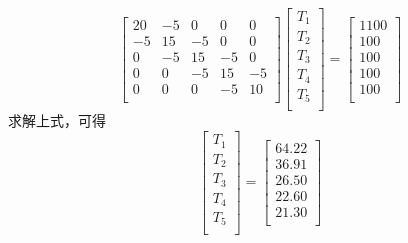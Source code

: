 \begin{equation}
  \begin{bmatrix}
    20 & -5 & 0 & 0 & 0 \\
    -5 & 15 & -5 & 0 & 0 \\
    0 & -5 & 15 & -5 & 0  \\
    0 & 0 & -5 & 15 & -5   \\
    0 & 0 & 0 & -5 & 10 \\
  \end{bmatrix}
  \begin{bmatrix}
    T_{1} \\
    T_{2} \\
    T_{3} \\
    T_{4} \\
    T_{5} \\
  \end{bmatrix}
  =
  \begin{bmatrix}
    1100 \\
    100 \\ 
    100 \\ 
    100 \\ 
    100 \\ 
  \end{bmatrix}
\end{equation}
求解上式，可得
\begin{equation}
  \begin{bmatrix}
    T_{1} \\
    T_{2} \\
    T_{3} \\
    T_{4} \\
    T_{5} \\
  \end{bmatrix}
  =
  \begin{bmatrix}
    64.22 \\
    36.91 \\ 
    26.50 \\ 
    22.60 \\ 
    21.30 \\ 
  \end{bmatrix}
\end{equation}

